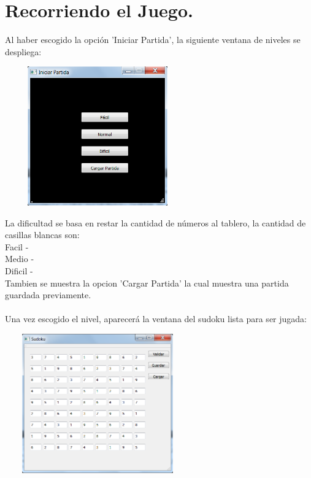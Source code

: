 \documentclass[12pt]{article}
\begin{document}
\section{Recorriendo el Juego.}
	Al haber escogido la opción 'Iniciar Partida', la siguiente ventana de niveles se despliega:
		\begin{center}
			\includegraphics[height=6cm,width=8cm]{ventana_niveles.png}
		\end{center}
	La dificultad se basa en restar la cantidad de números al tablero, la cantidad de casillas blancas son:
		\\Facil   - 
		\\Medio - 
		\\Dificil  - 
		\\Tambien se muestra la opcion 'Cargar Partida' la cual muestra una partida guardada previamente.	
		\\\\Una vez escogido el nivel, aparecerá la ventana del sudoku lista para ser jugada:
		\begin{center}
			\includegraphics[height=6cm,width=8cm]{ventana_sudoku.png}
		\end{center}



		
\end{document}
